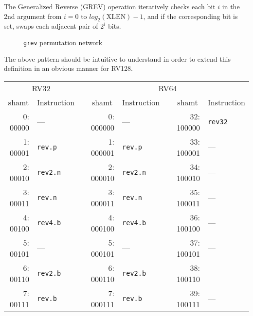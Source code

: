 The Generalized Reverse (GREV) operation iteratively checks each bit $i$ in the
2nd argument from $i=0$ to $log_2(\textrm{XLEN})-1$, and if the corresponding bit is
set, swaps each adjacent pair of $2^i$ bits.

\begin{figure}[t]
\begin{center}

\end{center}
\caption{\texttt{grev} permutation network}
\label{permnet-grev}
\end{figure}



The above pattern should be intuitive to understand in order to extend
this definition in an obvious manner for RV128.

\begin{table}[t]
\begin{small}
\begin{center}
\begin{tabular}{r l p{0.5in} r l p{0.3in} r l}

\multicolumn{2}{c}{RV32} & &
\multicolumn{5}{c}{RV64} \\

\cline{1-2}
\cline{4-8}

\multicolumn{1}{c}{shamt} & Instruction & &
\multicolumn{1}{c}{shamt} & Instruction & &
\multicolumn{1}{c}{shamt} & Instruction \\

\cline{1-2}
\cline{4-5}
\cline{7-8}

 0: 00000 & ---           &   &  0: 000000 & ---           &   & 32: 100000 & {\tt rev32} \\
 1: 00001 & {\tt rev.p}   &   &  1: 000001 & {\tt rev.p}   &   & 33: 100001 & ---         \\
 2: 00010 & {\tt rev2.n}  &   &  2: 000010 & {\tt rev2.n}  &   & 34: 100010 & ---         \\
 3: 00011 & {\tt rev.n}   &   &  3: 000011 & {\tt rev.n}   &   & 35: 100011 & ---         \\
 4: 00100 & {\tt rev4.b}  &   &  4: 000100 & {\tt rev4.b}  &   & 36: 100100 & ---         \\
 5: 00101 & ---           &   &  5: 000101 & ---           &   & 37: 100101 & ---         \\
 6: 00110 & {\tt rev2.b}  &   &  6: 000110 & {\tt rev2.b}  &   & 38: 100110 & ---         \\
 7: 00111 & {\tt rev.b}   &   &  7: 000111 & {\tt rev.b}   &   & 39: 100111 & ---         \\


\end{tabular}
\end{center}
\end{small}
\end{table}
